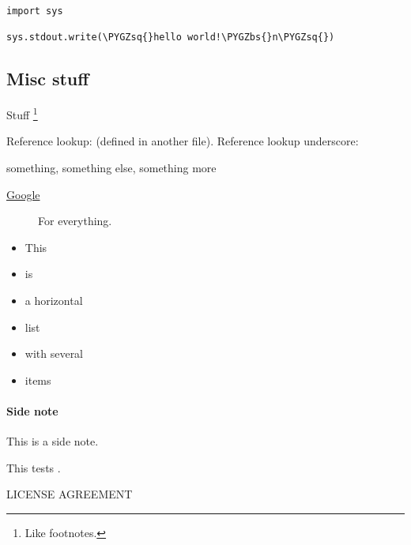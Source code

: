 \documentclass[letterpaper,10pt,english]{sphinxhowto}
\def\PYGZbs{\char`\\}
\def\PYGZsq{\char`\'}
\renewcommand\PYGZsq{\textquotesingle}
\begin{document}
\begin{Verbatim}[commandchars=\\\{\}]
import sys

sys.stdout.write(\PYGZsq{}hello world!\PYGZbs{}n\PYGZsq{})
\end{Verbatim}


\subsection{Misc stuff}
\label{markup:misc-stuff}
Stuff \footnote[1]{\sphinxAtStartFootnote%
Like footnotes.
}

Reference lookup: \label{markup:id3}{\hyperref[markup:ref1]{\crossref{{[}Ref1{]}}}} (defined in another file).
Reference lookup underscore: \label{markup:id4}{\hyperref[markup:ref\string-1]{\crossref{{[}Ref\_1{]}}}}




something, something else, something more
\begin{description}
\item[{\href{http://www.google.com}{Google}}] \leavevmode
For everything.

\end{description}


\begin{itemize}\setlength{\itemsep}{0pt}\setlength{\parskip}{0pt}
\item {} 
This

\item {} 
is

\item {} 
a horizontal

\item {} 
list

\item {} 
with several

\item {} 
items

\end{itemize}
\paragraph{Side note}

This is a side note.

This tests .

\begin{center}LICENSE AGREEMENT
\end{center}
\end{document}
